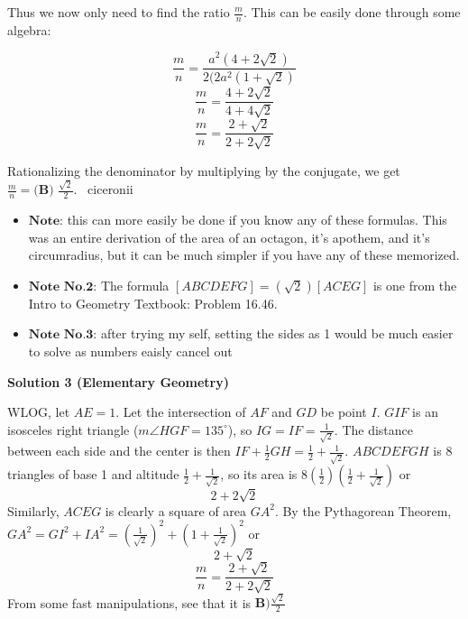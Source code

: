\begin{enumerate}
 Thus we now only need to find the ratio $\frac{m}{n}$. This can be easily done through some algebra:

 
 \[\frac{m}{n} = \frac{a^2(4+2\sqrt{2})}{2(2a^2(1+\sqrt{2})}\]
 \[\frac{m}{n} = \frac{4+2\sqrt{2}}{4+4\sqrt{2}}\]
 \[\frac{m}{n} = \frac{2+\sqrt{2}}{2+2\sqrt{2}}\]

 Rationalizing the denominator by multiplying by the conjugate, we get $\frac{m}{n} = \boxed{\textbf{(B) } \frac{\sqrt{2}}{2}}$. ~ciceronii

 
            \begin{itemize}
        \item $\textbf{Note:}$ this can more easily be done if you know any of these formulas. This was an entire derivation of the area of an octagon, it's apothem, and it's circumradius, but it can be much simpler if you have any of these memorized.
            \end{itemize}
            
            \begin{itemize}
        \item $\textbf{Note No.2:}$ The formula $[ABCDEFG]=(\sqrt{2})[ACEG]$ is one from the Intro to Geometry Textbook: Problem 16.46.
            \end{itemize}
            
            \begin{itemize}
        \item $\textbf{Note No.3:}$ after trying my self, setting the sides as 1 would be much easier to solve as numbers eaisly cancel out
            \end{itemize}
            



\textbf{Solution 3 (Elementary Geometry)}

WLOG, let $AE=1$. Let the intersection of $AF$ and $GD$ be point $I$. $GIF$ is an isosceles right triangle ($m\angle HGF=135^{\circ}$), so $IG=IF=\frac{1}{\sqrt{2}}$. The distance between each side and the center is then $IF+\frac{1}{2}GH=\frac{1}{2}+\frac{1}{\sqrt{2}}$. $ABCDEFGH$ is 8 triangles of base 1 and altitude $\frac{1}{2}+\frac{1}{\sqrt{2}}$, so its area is $8(\frac{1}{2})(\frac{1}{2}+\frac{1}{\sqrt{2}})$ or 
 \[2+2\sqrt{2}\]Similarly, $ACEG$ is clearly a  square of area $GA^2$. By the Pythagorean Theorem, $GA^2=GI^2+IA^2=(\frac{1}{\sqrt{2}})^2+(1+\frac{1}{\sqrt{2}})^2$ or 
 \[2+\sqrt{2}\]
 \[\frac{m}{n} = \frac{2+\sqrt{2}}{2+2\sqrt{2}}\]From some fast manipulations, see that it is $\boxed{\textbf{B)}\frac{\sqrt{2}}{{2}}}$





\end{enumerate}
